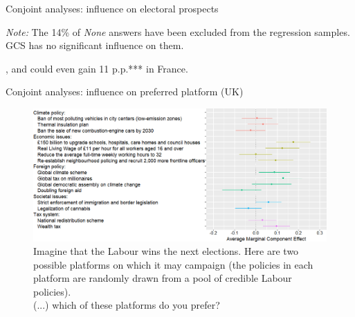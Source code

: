 \documentclass[aspectratio=169,xcolor=dvipsnames, 11pt,mathserif]{beamer}
\begin{document}
\begin{framefont}{\small}
\begin{frame}{Conjoint analyses: influence on electoral prospects\label{conjoint_c}}
{\begin{table}[h]
        \makebox[\textwidth][c]{}
        {\footnotesize \textit{Note:} The 14\% of \textit{None} answers have been excluded from the regression samples. GCS has no significant influence on them. }
      \end{table} \vspace*{-.2cm}
      \bbvs \ip {}, and could even gain 11 p.p.*** in France.
      \ee
      }
\end{frame}

\begin{frame}{Conjoint analyses: influence on preferred platform (UK)\label{conjoint_r_uk} \hyperlink{conjoint_r_eu}{} \hyperlink{conjoint_r_fr}{} \hyperlink{conjoint_r_us}{}} 
    \begin{figure}\vspace{-.2cm}
        \centering 
        \caption{Imagine that the Labour wins the next elections. Here are two possible platforms on which it may campaign (the policies in each platform are randomly drawn from a pool of credible Labour policies).\\
		(...) %
        which of these platforms do you prefer? %
        }
        \vspace{-.2cm} 
        \includegraphics[height=.77\textheight]{../figures/UK/ca_r.png} 
    \end{figure}
\end{frame}


\end{framefont}
\end{document}
